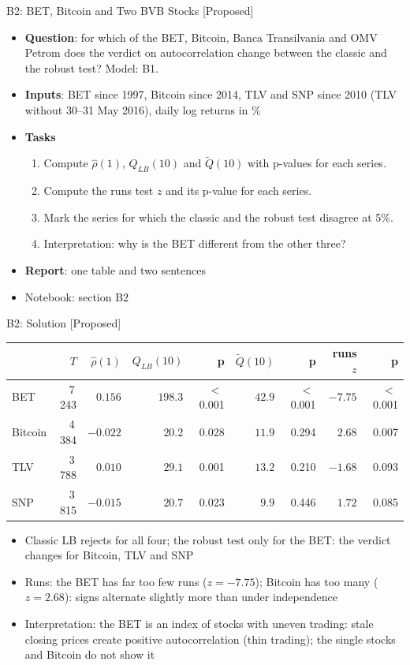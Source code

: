\begin{frame}{B2: BET, Bitcoin and Two BVB Stocks [Proposed]}
\itemsize{\footnotesize}
\begin{itemize}
\item \textbf{Question}: for which of the BET, Bitcoin, Banca Transilvania and OMV Petrom does the verdict on autocorrelation change between the classic and the robust test? Model: B1.
\item \textbf{Inputs}: BET since 1997, Bitcoin since 2014, TLV and SNP since 2010 (TLV without 30--31 May 2016), daily log returns in \%
\item \textbf{Tasks}
\begin{enumerate}
    \item Compute $\hat\rho(1)$, $Q_{LB}(10)$ and $\tilde Q(10)$ with p-values for each series.
    \item Compute the runs test $z$ and its p-value for each series.
    \item Mark the series for which the classic and the robust test disagree at 5\%.
    \item Interpretation: why is the BET different from the other three?
\end{enumerate}
\item \textbf{Report}: one table and two sentences
\item Notebook: section B2
\end{itemize}
\end{frame}

\ifsolutions
\begin{frame}{B2: Solution [Proposed]}
\itemsize{\footnotesize}
\begin{center}
\footnotesize
\begin{tabular}{lrrrrrrrr}
\toprule
& $T$ & $\hat\rho(1)$ & $Q_{LB}(10)$ & p & $\tilde Q(10)$ & p & runs $z$ & p \\
\midrule
BET & 7\,243 & ${0.156}$ & $198.3$ & $<$\,0.001 & $42.9$ & $<$\,0.001 & ${-7.75}$ & $<$\,0.001 \\
Bitcoin & 4\,384 & ${-0.022}$ & $20.2$ & 0.028 & $11.9$ & 0.294 & ${2.68}$ & 0.007 \\
TLV & 3\,788 & ${0.010}$ & $29.1$ & 0.001 & $13.2$ & 0.210 & ${-1.68}$ & 0.093 \\
SNP & 3\,815 & ${-0.015}$ & $20.7$ & 0.023 & $9.9$ & 0.446 & ${1.72}$ & 0.085 \\
\bottomrule
\end{tabular}
\end{center}
\begin{itemize}
    \item Classic LB rejects for all four; the robust test only for the BET: the verdict changes for Bitcoin, TLV and SNP
    \item Runs: the BET has far too few runs ($z = -7.75$); Bitcoin has too many ($z = 2.68$): signs alternate slightly more than under independence
    \item Interpretation: the BET is an index of stocks with uneven trading: stale closing prices create positive autocorrelation (thin trading); the single stocks and Bitcoin do not show it
\end{itemize}
\end{frame}
\fi

